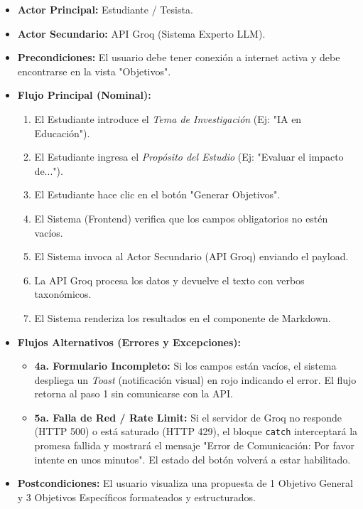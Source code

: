 \begin{itemize}
    \item \textbf{Actor Principal:} Estudiante / Tesista.
    \item \textbf{Actor Secundario:} API Groq (Sistema Experto LLM).
    \item \textbf{Precondiciones:} El usuario debe tener conexión a internet activa y debe encontrarse en la vista "Objetivos".
    \item \textbf{Flujo Principal (Nominal):}
    \begin{enumerate}
        \item El Estudiante introduce el \textit{Tema de Investigación} (Ej: "IA en Educación").
        \item El Estudiante ingresa el \textit{Propósito del Estudio} (Ej: "Evaluar el impacto de...").
        \item El Estudiante hace clic en el botón "Generar Objetivos".
        \item El Sistema (Frontend) verifica que los campos obligatorios no estén vacíos.
        \item El Sistema invoca al Actor Secundario (API Groq) enviando el payload.
        \item La API Groq procesa los datos y devuelve el texto con verbos taxonómicos.
        \item El Sistema renderiza los resultados en el componente de Markdown.
    \end{enumerate}
    \item \textbf{Flujos Alternativos (Errores y Excepciones):}
    \begin{itemize}
        \item \textbf{4a. Formulario Incompleto:} Si los campos están vacíos, el sistema despliega un \textit{Toast} (notificación visual) en rojo indicando el error. El flujo retorna al paso 1 sin comunicarse con la API.
        \item \textbf{5a. Falla de Red / Rate Limit:} Si el servidor de Groq no responde (HTTP 500) o está saturado (HTTP 429), el bloque \texttt{catch} interceptará la promesa fallida y mostrará el mensaje "Error de Comunicación: Por favor intente en unos minutos". El estado del botón volverá a estar habilitado.
    \end{itemize}
    \item \textbf{Postcondiciones:} El usuario visualiza una propuesta de 1 Objetivo General y 3 Objetivos Específicos formateados y estructurados.
\end{itemize}

